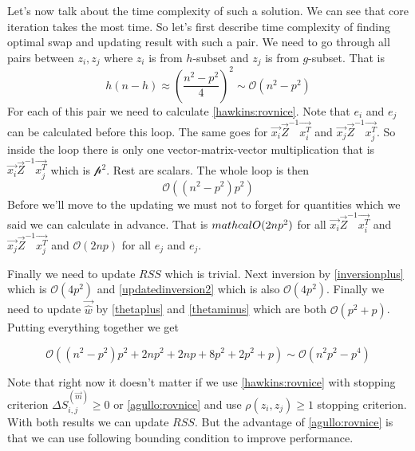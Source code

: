

Let's now talk about the time complexity of such a solution. We can see that core iteration takes the most time. So let's first describe time complexity of finding optimal swap and updating result with such a pair. 
We need to go through all pairs between $z_i, z_j$ where $z_i$ is from $h$-subset and $z_j$ is from $g$-subset. That is 
\begin{equation}
    h(n-h) \approx (\frac{n^2 - p^2}{4})^2 \sim \mathcal{O}(n^2 - p^2)
\end{equation}
For each of this pair we need to calculate \ref{hawkins:rovnice}. Note that $e_i$ and $e_j$ can be calculated before this loop. The same goes for $\vec{x_i}\vec{Z}^{-1}\vec{x_i^T}$ and $\vec{x_j}\vec{Z}^{-1}\vec{x_j^T} $. So inside the loop there is only one vector-matrix-vector multiplication that is $\vec{x_i}\vec{Z}^{-1}\vec{x_j^T}$ which is $\mathcal{p^2}$. Rest are scalars. The whole loop is then 
\begin{equation}
    \mathcal{O}( (n^2 - p^2) p^2) 
\end{equation}
Before we'll move to the updating we must not to forget for quantities which we said we can calculate in advance. That is $\\mathcal{O}(2np^2)$ for all $\vec{x_i}\vec{Z}^{-1}\vec{x_i^T}$ and $\vec{x_j}\vec{Z}^{-1}\vec{x_j^T}$ and $\mathcal{O}(2np)$ for all $e_j$ and $e_j$.

Finally we need to update $RSS$ which is trivial. Next inversion by \ref{inversionplus} which is $\mathcal{O}(4p^2)$ and \ref{updatedinversion2} which is also $\mathcal{O}(4p^2)$. Finally we need to update $\vec{\hat{w}}$ by \ref{thetaplus} and \ref{thetaminus} which are both $\mathcal{O}(p^2 +p)$. Putting everything together we get

\begin{equation}
    \mathcal{O}( (n^2 - p^2) p^2 + 2np^2 + 2np + 8p^2 + 2p^2 + p) \sim \mathcal{O}(n^2p^2 - p^4) 
\end{equation}


Note that right now it doesn't matter if we use \ref{hawkins:rovnice} with stopping criterion $    \Delta S^{(\vec{m})}_{i,j} \geq 0$  or \ref{agullo:rovnice} and use $\rho(z_i, z_j) \geq 1 $ stopping criterion. With both results we can update $RSS$. But the advantage of \ref{agullo:rovnice} is that we can use following bounding condition to improve performance.


